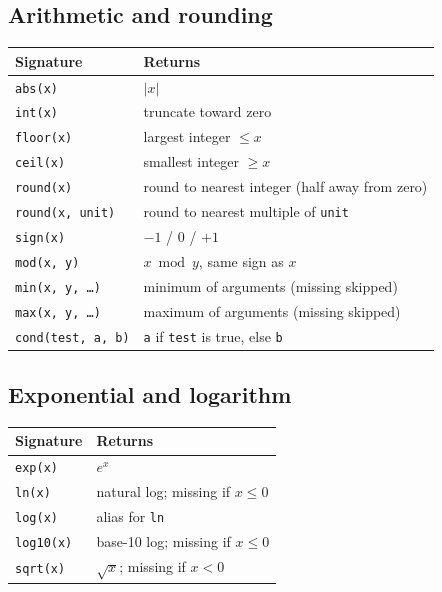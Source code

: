 \documentclass[11pt,letterpaper]{article}
\begin{document}
\subsection{Arithmetic and rounding}

\begin{center}
\begin{tabular}{ll}
\toprule
Signature & Returns \\
\midrule
\texttt{abs(x)} & $|x|$ \\
\texttt{int(x)} & truncate toward zero \\
\texttt{floor(x)} & largest integer $\le x$ \\
\texttt{ceil(x)} & smallest integer $\ge x$ \\
\texttt{round(x)} & round to nearest integer (half away from zero) \\
\texttt{round(x, unit)} & round to nearest multiple of \texttt{unit} \\
\texttt{sign(x)} & $-1$ / $0$ / $+1$ \\
\texttt{mod(x, y)} & $x \bmod y$, same sign as $x$ \\
\texttt{min(x, y, \ldots)} & minimum of arguments (missing skipped) \\
\texttt{max(x, y, \ldots)} & maximum of arguments (missing skipped) \\
\texttt{cond(test, a, b)} & \texttt{a} if \texttt{test} is true, else \texttt{b} \\
\bottomrule
\end{tabular}
\end{center}

\subsection{Exponential and logarithm}

\begin{center}
\begin{tabular}{ll}
\toprule
Signature & Returns \\
\midrule
\texttt{exp(x)} & $e^x$ \\
\texttt{ln(x)} & natural log; missing if $x \le 0$ \\
\texttt{log(x)} & alias for \texttt{ln} \\
\texttt{log10(x)} & base-10 log; missing if $x \le 0$ \\
\texttt{sqrt(x)} & $\sqrt{x}$; missing if $x < 0$ \\
\bottomrule
\end{tabular}
\end{center}
\end{document}
